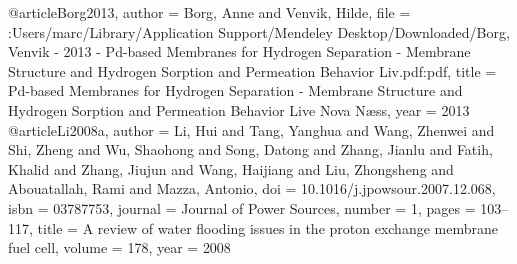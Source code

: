 @article{Borg2013,
author = {Borg, Anne and Venvik, Hilde},
file = {:Users/marc/Library/Application Support/Mendeley Desktop/Downloaded/Borg, Venvik - 2013 - Pd-based Membranes for Hydrogen Separation - Membrane Structure and Hydrogen Sorption and Permeation Behavior Liv.pdf:pdf},
title = {{Pd-based Membranes for Hydrogen Separation - Membrane Structure and Hydrogen Sorption and Permeation Behavior Live Nova N{\ae}ss}},
year = {2013}
}
@article{Li2008a,
author = {Li, Hui and Tang, Yanghua and Wang, Zhenwei and Shi, Zheng and Wu, Shaohong and Song, Datong and Zhang, Jianlu and Fatih, Khalid and Zhang, Jiujun and Wang, Haijiang and Liu, Zhongsheng and Abouatallah, Rami and Mazza, Antonio},
doi = {10.1016/j.jpowsour.2007.12.068},
isbn = {03787753},
journal = {Journal of Power Sources},
number = {1},
pages = {103--117},
title = {{A review of water flooding issues in the proton exchange membrane fuel cell}},
volume = {178},
year = {2008}
}

